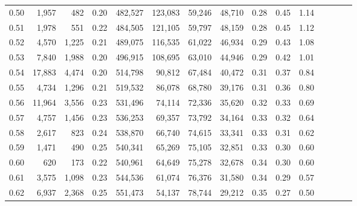 \begin{tabular}{rrrcrrrrrrrrrrr}
0.50 &   1,957 &    482 &                                       0.20 &  482,527 &  123,083 &   59,246 &   48,710 &  0.28 &  0.45 &                         1.14 \\
0.51 &   1,978 &    551 &                                       0.22 &  484,505 &  121,105 &   59,797 &   48,159 &  0.28 &  0.45 &                         1.12 \\
0.52 &   4,570 &  1,225 &                                       0.21 &  489,075 &  116,535 &   61,022 &   46,934 &  0.29 &  0.43 &                         1.08 \\
0.53 &   7,840 &  1,988 &                                       0.20 &  496,915 &  108,695 &   63,010 &   44,946 &  0.29 &  0.42 &                         1.01 \\
0.54 &  17,883 &  4,474 &                                       0.20 &  514,798 &   90,812 &   67,484 &   40,472 &  0.31 &  0.37 &                         0.84 \\
0.55 &   4,734 &  1,296 &                                       0.21 &  519,532 &   86,078 &   68,780 &   39,176 &  0.31 &  0.36 &                         0.80 \\
0.56 &  11,964 &  3,556 &                                       0.23 &  531,496 &   74,114 &   72,336 &   35,620 &  0.32 &  0.33 &                         0.69 \\
0.57 &   4,757 &  1,456 &                                       0.23 &  536,253 &   69,357 &   73,792 &   34,164 &  0.33 &  0.32 &                         0.64 \\
0.58 &   2,617 &    823 &                                       0.24 &  538,870 &   66,740 &   74,615 &   33,341 &  0.33 &  0.31 &                         0.62 \\
0.59 &   1,471 &    490 &                                       0.25 &  540,341 &   65,269 &   75,105 &   32,851 &  0.33 &  0.30 &                         0.60 \\
0.60 &     620 &    173 &                                       0.22 &  540,961 &   64,649 &   75,278 &   32,678 &  0.34 &  0.30 &                         0.60 \\
0.61 &   3,575 &  1,098 &                                       0.23 &  544,536 &   61,074 &   76,376 &   31,580 &  0.34 &  0.29 &                         0.57 \\
0.62 &   6,937 &  2,368 &                                       0.25 &  551,473 &   54,137 &   78,744 &   29,212 &  0.35 &  0.27 &                         0.50 \\

\end{tabular}
